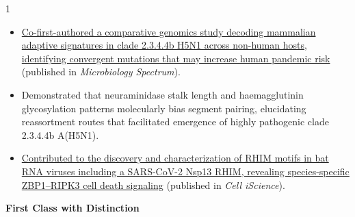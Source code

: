 \documentclass[11pt,letterpaper,withhyper]{altacv}
\begin{document}
\begin{paracol}{1}
\begin{itemize}
	\justifying
	\item \href{https://doi.org/10.1128/spectrum.00948-25}{Co-first-authored a comparative genomics study decoding mammalian adaptive signatures in clade 2.3.4.4b H5N1 across non-human hosts, identifying convergent mutations that may increase human pandemic risk} (published in \textit{Microbiology Spectrum}).
	\item Demonstrated that neuraminidase stalk length and haemagglutinin glycosylation patterns molecularly bias segment pairing, elucidating reassortment routes that facilitated emergence of highly pathogenic clade 2.3.4.4b A(H5N1).
	\item \href{https://www.cell.com/iscience/fulltext/S2589-0042(24)02671-3}{Contributed to the discovery and characterization of RHIM motifs in bat RNA viruses including a SARS-CoV-2 Nsp13 RHIM, revealing species-specific ZBP1--RIPK3 cell death signaling} (published in \textit{Cell iScience}).
\end{itemize}

	
\begin{minipage}[t]{0.52\textwidth}
\end{minipage}%
\hfill
\begin{minipage}[t]{0.46\textwidth}
\textbf{First Class with Distinction}
\end{minipage}
	
\medskip



\divider\smallskip



\end{paracol}
\end{document}
